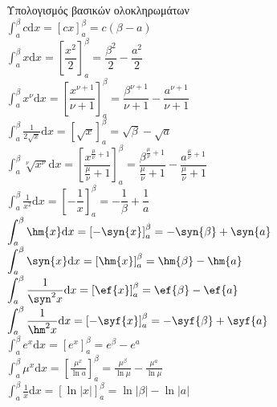 \begin{mytblr}{}
Υπολογισμός βασικών ολοκληρωμάτων \\
$\displaystyle\int_{a}^{\beta}{c\mathrm{d}x}=[cx]_{a}^{\beta}=c(\beta-a)$\\
$\displaystyle\int_{a}^{\beta}{x\mathrm{d}x}=\left[\dfrac{x^2}{2}\right]_{a}^{\beta}=\dfrac{\beta^2}{2}-\dfrac{a^2}{2}$\\
$\displaystyle\int_{a}^{\beta}{x^{\nu}\mathrm{d}x}=\left[\dfrac{x^{\nu+1}}{\nu+1}\right]_{a}^{\beta}=\dfrac{\beta^{\nu+1}}{\nu+1}-\dfrac{a^{\nu+1}}{\nu+1}$\\
$\displaystyle\int_{a}^{\beta}{\frac{1}{2\sqrt{x}}\mathrm{d}x}=\left[\sqrt{x}\right]_{a}^{\beta}=\sqrt{\beta}-\sqrt{a}$\\
$\displaystyle\int_{a}^{\beta}{\sqrt[\nu]{x^{\nu}}\mathrm{d}x}=\left[\dfrac{x^{\frac{\mu}{\nu}+1}}{\frac{\mu}{\nu}+1}\right]_{a}^{\beta}=\dfrac{\beta^{\frac{\mu}{\nu}+1}}{\frac{\mu}{\nu}+1}-\dfrac{a^{\frac{\mu}{\nu}+1}}{\frac{\mu}{\nu}+1}$\\
$\displaystyle\int_{a}^{\beta}{\frac{1}{x^2}\mathrm{d}x}=\left[-\dfrac{1}{x}\right]_{a}^{\beta}=-\dfrac{1}{\beta}+\dfrac{1}{a}$\\
$\displaystyle\int_{a}^{\beta}{\hm{x}\mathrm{d}x}=\left[-\syn{x}\right]_{a}^{\beta}=-\syn{\beta}+\syn{a}$\\
$\displaystyle\int_{a}^{\beta}{\syn{x}\mathrm{d}x}=\left[\hm{x}\right]_{a}^{\beta}=\hm{\beta}-\hm{a}$\\
$\displaystyle\int_{a}^{\beta}{\frac{1}{\syn^2{x}}\mathrm{d}x}=\left[\ef{x}\right]_{a}^{\beta}=\ef{\beta}-\ef{a}$\\
$\displaystyle\int_{a}^{\beta}{\frac{1}{\hm^2{x}}\mathrm{d}x}=\left[-\syf{x}\right]_{a}^{\beta}=-\syf{\beta}+\syf{a}$\\
$\displaystyle\int_{a}^{\beta}{e^x\mathrm{d}x}=\left[e^{x}\right]_{a}^{\beta}=e^{\beta}-e^{a}$\\
$\displaystyle\int_{a}^{\beta}{{\mu}^x\mathrm{d}x}=\left[\frac{{\mu}^x}{\ln{a}}\right]_{a}^{\beta}=\frac{{\mu}^{\beta}}{\ln{\mu}}-\frac{\mu^{a}}{\ln{\mu}}$\\
$\displaystyle\int_{a}^{\beta}{\frac{1}{x}\mathrm{d}x}=\left[\ln{|x|}\right]_{a}^{\beta}=\ln|\beta|-\ln{|a|}$\\
\end{mytblr}
